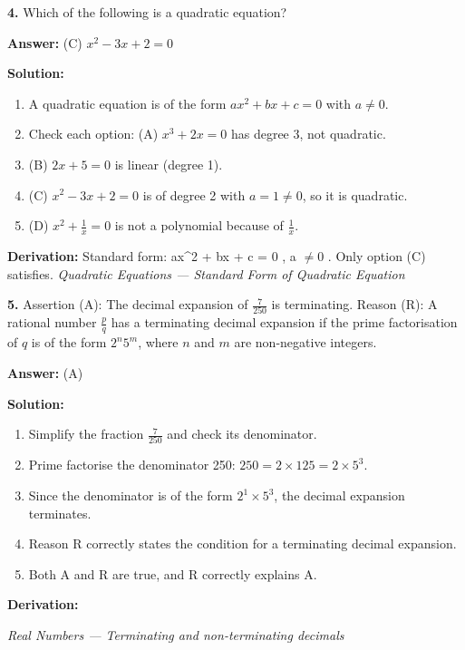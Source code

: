 \documentclass[12pt,a4paper]{exam}
\newcommand{\fitmath}[1]{%
  \sbox{\schmathbox}{$\displaystyle #1$}%
  \ifdim\wd\schmathbox>\linewidth
    \resizebox{\linewidth}{!}{\usebox{\schmathbox}}%
  \else
    \usebox{\schmathbox}%
  \fi}
\begin{document}
\begin{questions}
\question \textbf{4.} Which of the following is a quadratic equation?

\textbf{Answer:}
(C) $x^2 - 3x + 2 = 0$

\textbf{Solution:}
\begin{enumerate}
  \item A quadratic equation is of the form $ax^2 + bx + c = 0$ with $a \neq 0$.
  \item Check each option: (A) $x^3 + 2x = 0$ has degree 3, not quadratic.
  \item (B) $2x + 5 = 0$ is linear (degree 1).
  \item (C) $x^2 - 3x + 2 = 0$ is of degree 2 with $a = 1 \neq 0$, so it is quadratic.
  \item (D) $x^2 + \frac{1}{x} = 0$ is not a polynomial because of $\frac{1}{x}$.
\end{enumerate}
\textbf{Derivation:}
Standard form:  ax\textasciicircum{}2 + bx + c = 0 ,  a $\neq 0$ . Only option (C) satisfies.
\hfill \textit{Quadratic Equations — Standard Form of Quadratic Equation}
\vspace{0.3cm}

\question \textbf{5.} Assertion (A): The decimal expansion of $\frac{7}{250}$ is terminating.
Reason (R): A rational number $\frac{p}{q}$ has a terminating decimal expansion if the prime factorisation of $q$ is of the form $2^n 5^m$, where $n$ and $m$ are non-negative integers.

\textbf{Answer:}
(A)

\textbf{Solution:}
\begin{enumerate}
  \item Simplify the fraction $\frac{7}{250}$ and check its denominator.
  \item Prime factorise the denominator 250: $250 = 2 \times 125 = 2 \times 5^3$.
  \item Since the denominator is of the form $2^1 \times 5^3$, the decimal expansion terminates.
  \item Reason R correctly states the condition for a terminating decimal expansion.
  \item Both A and R are true, and R correctly explains A.
\end{enumerate}
\textbf{Derivation:}
\begin{center}
\fitmath{250 = 2 \times 5^3 = 2^1 \times 5^3}
\end{center}
\hfill \textit{Real Numbers — Terminating and non-terminating decimals}
\vspace{0.3cm}


\end{questions}
\end{document}
